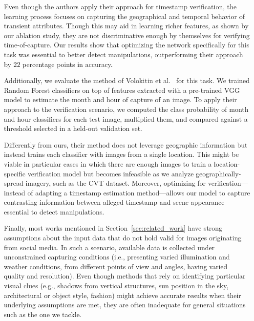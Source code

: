 \documentclass[journal]{IEEEtran}
\begin{document}
        Even though the authors apply their approach for timestamp verification, the learning process focuses on capturing the geographical and temporal behavior of transient attributes. Though this may aid in learning richer features, as shown by our ablation study, they are not discriminative enough by themselves for verifying time-of-capture. Our results show that optimizing the network specifically for this task was essential to better detect manipulations, outperforming their approach by $22$ percentage points in accuracy.
        
        Additionally, we evaluate the method of Volokitin et al.~\cite{volokitin2016deep} for this task. We trained Random Forest classifiers on top of features extracted with a pre-trained VGG model to estimate the month and hour of capture of an image. To apply their approach to the verification scenario, we computed the class probability of month and hour classifiers for each test image, multiplied them, and compared against a threshold selected in a held-out validation set.
        
        Differently from ours, their method does not leverage geographic information but instead trains each classifier with images from a single location. This might be viable in particular cases in which there are enough images to train a location-specific verification model but becomes infeasible as we analyze geographically-spread imagery, such as the CVT dataset. Moreover, optimizing for verification---instead of adapting a timestamp estimation method---allows our model to capture contrasting information between alleged timestamp and scene appearance essential to detect manipulations.
        
        Finally, most works mentioned in Section~\ref{sec:related_work} have strong assumptions about the input data that do not hold valid for images originating from social media. In such a scenario, available data is collected under unconstrained capturing conditions (i.e., presenting varied illumination and weather conditions, from different points of view and angles, having varied quality and resolution). Even though methods that rely on identifying particular visual clues (e.g., shadows from vertical structures, sun position in the sky, architectural or object style, fashion) might achieve accurate results when their underlying assumptions are met, they are often inadequate for general situations such as the one we tackle.
        


        
        
\end{document}
